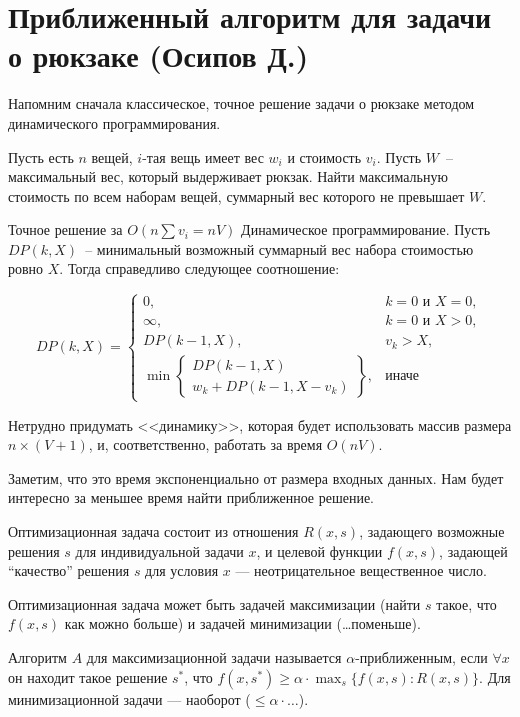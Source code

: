 \section{Приближенный алгоритм для задачи о рюкзаке (Осипов Д.)}
Напомним сначала классическое, точное решение задачи о рюкзаке методом динамического программирования.

\begin{problem*}[0/1-рюкзак]
	Пусть есть $n$ вещей, $i$-тая вещь имеет вес $w_i$ и стоимость $v_i$. Пусть $W$~-- максимальный вес, который выдерживает рюкзак. Найти максимальную стоимость по всем наборам вещей, суммарный вес которого не превышает $W$.
\end{problem*}

\begin{algodescription}{Точное решение за $O\left(n\sum{v_i}=nV\right)$} Динамическое программирование. Пусть $DP(k, X)$~-- минимальный возможный суммарный вес набора стоимостью ровно $X$. Тогда справедливо следующее соотношение:

$$ DP(k, X) = 
\begin{cases}
    0, & k=0\text{ и }X=0, \\
    \infty, & k=0\text{ и }X>0, \\
    DP(k-1, X), & v_k > X, \\
    \min \begin{Bmatrix}
        DP(k-1, X) \\ w_k + DP(k-1, X-v_k)
    \end{Bmatrix}, & \text{иначе}
\end{cases}
$$

Нетрудно придумать <<динамику>>, которая будет использовать массив размера $n \times (V+1)$, и, соответственно, работать за время $O(nV)$.
\end{algodescription}

Заметим, что это время экспоненциально от размера входных данных.
Нам будет интересно за меньшее время найти приближенное решение.
\begin{definition*}
Оптимизационная задача состоит из отношения $R(x,s)$, задающего возможные решения $s$ для индивидуальной задачи $x$,
и целевой функции $f(x,s)$, задающей ``качество'' решения $s$ для условия $x$ --- неотрицательное вещественное число.

Оптимизационная задача может быть задачей максимизации (найти $s$ такое, что $f(x,s)$ как можно больше)
и задачей минимизации (\ldots поменьше).

Алгоритм $A$ для максимизационной задачи называется $\alpha$-приближенным,
если $\forall x$ он находит такое решение $s^*$, что $f(x,s^*)\ge \alpha\cdot \max_s \{f(x,s)\colon R(x,s)\}$.
Для минимизационной задачи --- наоборот ($\le \alpha \cdot \ldots$).
\end{definition*}

